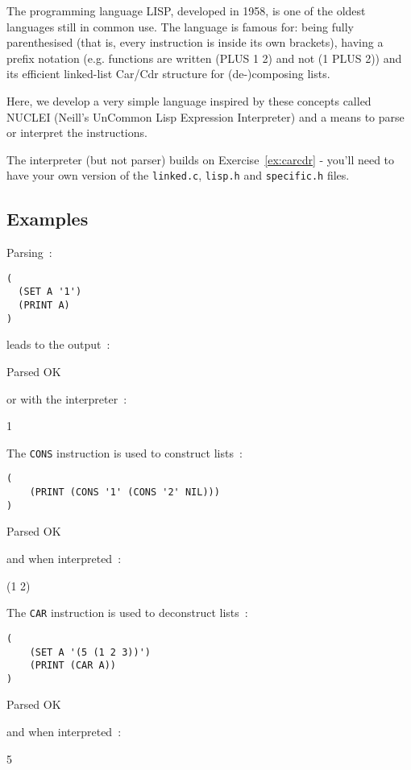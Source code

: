 
The programming language LISP, developed in 1958,
is one of the oldest languages still in common use.
The language is famous for: being fully parenthesised (that is,
every instruction is inside its own brackets), having a prefix notation (e.g.
functions are written (PLUS 1 2) and not (1 PLUS 2)) and its efficient
linked-list Car/Cdr structure for (de-)composing lists.

Here, we develop a very simple language inspired by these concepts called
NUCLEI (Neill's UnCommon Lisp Expression Interpreter) and a means to
parse or interpret the instructions.

The interpreter (but not parser) builds on Exercise~\ref{ex:carcdr} -
you'll need to have your own version of the \verb^linked.c^,
\verb^lisp.h^ and \verb^specific.h^ files.

\subsection*{Examples}

Parsing~:
\begin{verbatim}
(
  (SET A '1')
  (PRINT A)
)
\end{verbatim}


\noindent leads to the output~:
\begin{terminaloutput}
Parsed OK
\end{terminaloutput}
\noindent or with the interpreter~:
\begin{terminaloutput}
1
\end{terminaloutput}

The \verb^CONS^ instruction is used to construct lists~:
\begin{verbatim}
(
    (PRINT (CONS '1' (CONS '2' NIL)))
)
\end{verbatim}

\begin{terminaloutput}
Parsed OK
\end{terminaloutput}
\noindent and when interpreted~:
\begin{terminaloutput}
(1 2)
\end{terminaloutput}

The \verb^CAR^ instruction is used to deconstruct lists~:
\begin{verbatim}
(
    (SET A '(5 (1 2 3))')
    (PRINT (CAR A))
)
\end{verbatim}
\begin{terminaloutput}
Parsed OK
\end{terminaloutput}
\noindent and when interpreted~:
\begin{terminaloutput}
5
\end{terminaloutput}



